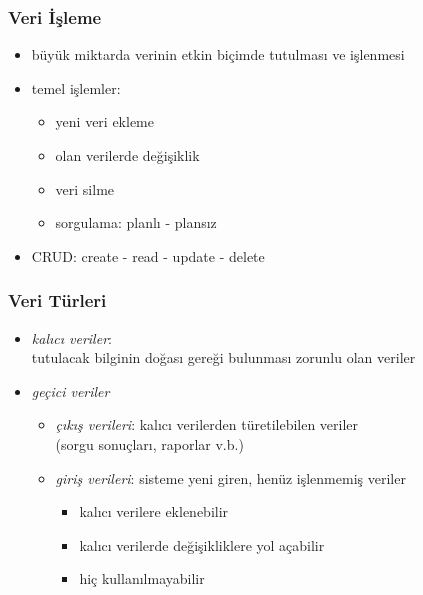 \documentclass[dvipsnames]{beamer}
\theoremstyle{definition}
\theoremstyle{example}
\theoremstyle{plain}
\begin{document}
\begin{frame}
  \frametitle{Veri İşleme}

  \begin{itemize}
    \item büyük miktarda verinin etkin biçimde tutulması ve işlenmesi

    \pause
    \medskip
    \item temel işlemler:
    \begin{itemize}
      \item yeni veri ekleme
      \item olan verilerde değişiklik
      \item veri silme
      \item sorgulama: planlı - plansız
    \end{itemize}
    \item \alert{CRUD}: create - read - update - delete
  \end{itemize}
\end{frame}

\begin{frame}
  \frametitle{Veri Türleri}

  \begin{itemize}
    \item \emph{kalıcı veriler}:\\
      tutulacak bilginin doğası gereği bulunması zorunlu olan veriler

    \pause
    \bigskip
    \item \emph{geçici veriler}
    \begin{itemize}
      \item \emph{çıkış verileri}: kalıcı verilerden türetilebilen veriler\\
        (sorgu sonuçları, raporlar v.b.)

      \medskip
      \item \emph{giriş verileri}: sisteme yeni giren, henüz işlenmemiş veriler
      \begin{itemize}
        \item kalıcı verilere eklenebilir
        \item kalıcı verilerde değişikliklere yol açabilir
        \item hiç kullanılmayabilir
      \end{itemize}
    \end{itemize}
  \end{itemize}
\end{frame}
\end{document}
